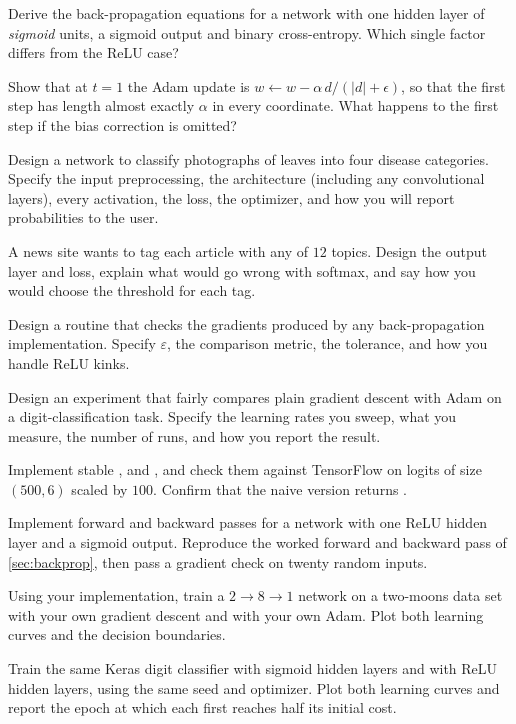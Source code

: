 \ap Derive the back-propagation equations for a network with one hidden layer of
\emph{sigmoid} units, a sigmoid output and binary cross-entropy. Which single
factor differs from the ReLU case?

\ap Show that at $t = 1$ the Adam update is $w \leftarrow w - \alpha\,
d/(|d| + \epsilon)$, so that the first step has length almost exactly $\alpha$ in
every coordinate. What happens to the first step if the bias correction is
omitted?


\dpr Design a network to classify photographs of leaves into four disease
categories. Specify the input preprocessing, the architecture (including any
convolutional layers), every activation, the loss, the optimizer, and how you
will report probabilities to the user.

\dpr A news site wants to tag each article with any of $12$ topics. Design the
output layer and loss, explain what would go wrong with softmax, and say how you
would choose the threshold for each tag.

\dpr Design a routine that checks the gradients produced by any back-propagation
implementation. Specify $\varepsilon$, the comparison metric, the tolerance, and
how you handle ReLU kinks.

\dpr Design an experiment that fairly compares plain gradient descent with Adam
on a digit-classification task. Specify the learning rates you sweep, what you
measure, the number of runs, and how you report the result.


\pe Implement stable ,  and
, and check them against TensorFlow on logits of size
$(500, 6)$ scaled by $100$. Confirm that the naive version returns .

\pe Implement forward and backward passes for a network with one ReLU hidden
layer and a sigmoid output. Reproduce the worked forward and backward pass of
\cref{sec:backprop}, then pass a gradient check on twenty random inputs.

\pe Using your implementation, train a $2\to8\to1$ network on a two-moons data
set with your own gradient descent and with your own Adam. Plot both learning
curves and the decision boundaries.

\pe Train the same Keras digit classifier with sigmoid hidden layers and with
ReLU hidden layers, using the same seed and optimizer. Plot both learning curves
and report the epoch at which each first reaches half its initial cost.

